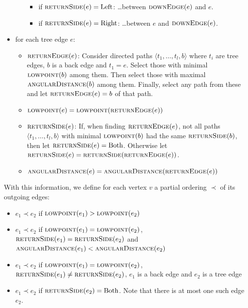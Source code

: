 \documentclass[a4paper]{article}
\begin{document}
\begin{itemize}
\begin{itemize}
                \begin{itemize}
                    \item
                        if $\textsc{returnSide}(e) = \mathrm{Left}$:
                        \dots{}between $\textsc{downEdge}(e)$ and
                        $e$.
                    \item
                        if $\textsc{returnSide}(e) = \mathrm{Right}$:
                        \dots{}between $e$ and
                        $\textsc{downEdge}(e)$.
                \end{itemize}
        \end{itemize}
    \item for each tree edge $e$:
        \begin{itemize}
            \item
                $\textsc{returnEdge}(e)$:
                Consider directed paths
                $\langle t_1,\dots,t_l,b \rangle$ where $t_i$
                are tree edges, $b$ is a back edge and $t_1 = e$.
                Select those with minimal $\textsc{lowpoint}(b)$ among them.
                Then select those with maximal $\textsc{angularDistance}(b)$ among them.
                Finally, select any path from these and let
                $\textsc{returnEdge}(e) = b$ of that path.
            \item
                $\textsc{lowpoint}(e) = \textsc{lowpoint}(\textsc{returnEdge}(e))$
            \item
                $\textsc{returnSide}(e)$:
                If, when finding $\textsc{returnEdge}(e)$, not all paths
                $\langle t_1, \dots, t_l, b \rangle$ with
                minimal $\textsc{lowpoint}(b)$ had the same
                $\textsc{returnSide}(b)$, then let $\textsc{returnSide}(e) =
                \mathrm{Both}$.
                Otherwise let $\textsc{returnSide}(e) =
                \textsc{returnSide}(\textsc{returnEdge}(e))$.
            \item
                $\textsc{angularDistance}(e) = \textsc{angularDistance}(\textsc{returnEdge}(e))$
        \end{itemize}
\end{itemize}
With this information, we define for each vertex $v$ a partial ordering $\prec$
of its outgoing edges:
\begin{itemize}
    \item $e_1 \prec e_2$ if $\textsc{lowpoint}(e_1) > \textsc{lowpoint}(e_2)$
    \item $e_1 \prec e_2$ if $\textsc{lowpoint}(e_1) = \textsc{lowpoint}(e_2)$,
        $\textsc{returnSide}(e_1) = \textsc{returnSide}(e_2)$ and
        $\textsc{angularDistance}(e_1) < \textsc{angularDistance}(e_2)$
    \item $e_1 \prec e_2$ if $\textsc{lowpoint}(e_1) = \textsc{lowpoint}(e_2)$,
        $\textsc{returnSide}(e_1) \not= \textsc{returnSide}(e_2)$,
        $e_1$ is a back edge and $e_2$ is a tree edge
    \item $e_1 \prec e_2$ if $\textsc{returnSide}(e_2) = \mathrm{Both}$.
        Note that there is at most one such edge $e_2$.
\end{itemize}
\end{document}
